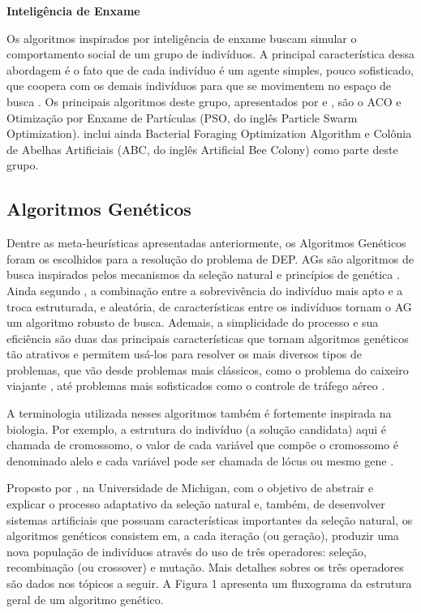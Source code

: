 \textbf{Inteligência de Enxame}

Os algoritmos inspirados por inteligência de enxame buscam simular o comportamento social de um grupo de indivíduos. A principal característica dessa abordagem é o fato que de cada indivíduo é um agente simples, pouco sofisticado, que coopera com os demais indivíduos para que se movimentem no espaço de busca \cite{Talbi2009}. Os principais algoritmos deste grupo, apresentados por  e , são o ACO e Otimização por Enxame de Partículas (PSO, do inglês Particle Swarm Optimization).  inclui ainda Bacterial Foraging Optimization Algorithm e Colônia de Abelhas Artificiais (ABC, do inglês Artificial Bee Colony) como parte deste grupo.

\subsection{Algoritmos Genéticos}

Dentre as meta-heurísticas apresentadas anteriormente, os Algoritmos Genéticos foram os escolhidos para a resolução do problema de DEP. AGs são algoritmos de busca inspirados pelos mecanismos da seleção natural e princípios de genética \cite{Goldberg1989}. Ainda segundo , a combinação entre a sobrevivência do indivíduo mais apto e a troca estruturada, e aleatória, de características entre os indivíduos tornam o AG um algoritmo robusto de busca. Ademais, a simplicidade do processo e sua eficiência são duas das principais características que tornam algoritmos genéticos tão atrativos e permitem usá-los para resolver os mais diversos tipos de problemas, que vão desde problemas mais clássicos, como o problema do caixeiro viajante \cite{Grefenstette1985}, até problemas mais sofisticados como o controle de tráfego aéreo \cite{Sergeeva2017}. 

A terminologia utilizada nesses algoritmos também é fortemente inspirada na biologia. Por exemplo, a estrutura do indivíduo (a solução candidata) aqui é chamada de cromossomo, o valor de cada variável que compõe o cromossomo é denominado alelo e cada variável pode ser chamada de lócus ou mesmo gene \cite{Back1997}.

Proposto por , na Universidade de Michigan, com o objetivo de abstrair e explicar o processo adaptativo da seleção natural e, também, de desenvolver sistemas artificiais que possuam características importantes da seleção natural, os algoritmos genéticos consistem em, a cada iteração (ou geração), produzir uma nova população de indivíduos através do uso de três operadores: seleção, recombinação (ou crossover) e mutação. Mais detalhes sobres os três operadores são dados nos tópicos a seguir. A Figura 1 apresenta um fluxograma da estrutura geral de um algoritmo genético. 

